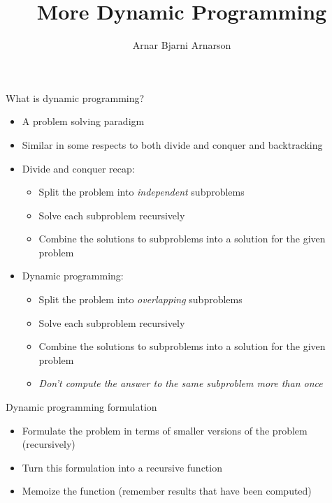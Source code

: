 \documentclass{beamer}
\title{More Dynamic Programming}
\author{Arnar Bjarni Arnarson}
\institute{\href{http://ru.is/td}{School of Computer Science} \\[2pt] \href{http://ru.is}{Reykjavík University}}
\begin{document}
\maketitle

\begin{frame}[plain]{What is dynamic programming?}
    \begin{itemize}
        \item A problem solving paradigm
        \item Similar in some respects to both divide and conquer and backtracking
        \vspace{5pt}
        \item Divide and conquer recap:
        \begin{itemize}
            \item Split the problem into \textit{independent} subproblems
            \item Solve each subproblem recursively
            \item Combine the solutions to subproblems into a solution for the given problem
        \end{itemize}
        \vspace{5pt}
        \item Dynamic programming:
        \begin{itemize}
            \item Split the problem into \textit{overlapping} subproblems
            \item Solve each subproblem recursively
            \item Combine the solutions to subproblems into a solution for the given problem
            \item \textit{Don't compute the answer to the same subproblem more than once}
        \end{itemize}
    \end{itemize}
\end{frame}

\begin{frame}{Dynamic programming formulation}
    \vspace{30pt}
    \begin{itemize}
        \item Formulate the problem in terms of smaller versions of the problem (recursively)
        \item Turn this formulation into a recursive function
        \item Memoize the function (remember results that have been computed)
    \end{itemize}
\end{frame}
\end{document}
